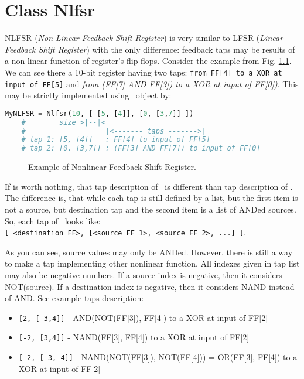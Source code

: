 \chapter{Class Nlfsr}

NLFSR (\textit{Non-Linear Feedback Shift Register}) is very similar to LFSR (\textit{Linear Feedback Shift Register}) with the only difference: feedback taps may be results of a non-linear function of register's flip-flops. Consider the example from Fig. \ref{nlfsr.example}. We can see there a 10-bit register having two taps: \texttt{from FF[4] to a XOR at input of FF[5]} and \textit{from (FF[7] AND FF[3]) to a XOR at input of FF[0])}. This may be strictly implemented using \Nlfsr\ object by:
\begin{lstlisting}[language=Python]
	MyNLFSR = Nlfsr(10, [ [5, [4]], [0, [3,7]] ])
	#        size >|--|<
	#                   |<------- taps ------->|
	# tap 1: [5, [4]]   : FF[4] to input of FF[5]
	# tap 2: [0. [3,7]] : (FF[3] AND FF[7]) to input of FF[0]
\end{lstlisting}

\begin{figure}[h]
	\centering
	\scalebox{.75}{}
	\caption{Example of Nonlinear Feedback Shift Register.}
	\label{nlfsr.example}
\end{figure}

\label{nlfsr:taps}
If is worth nothing, that tap description of \Nlfsr\ is different than tap description of \Lfsr. The difference is, that while each tap is still defined by a list, but the first item is not a source, but destination tap and the second item is a list of ANDed sources. So, each tap of \Nlfsr\ looks like: \\
\texttt{[ <destination\_FF>, [<source\_FF\_1>, <source\_FF\_2>, ...] ]}.

As you can see, source values may only be ANDed. However, there is still a way to make a tap implementing other nonlinear function. All indexes given in tap list may also be negative numbers. If a source index is negative, then it considers NOT(source). If a destination index is negative, then it considers NAND instead of AND. See example taps description:
\begin{itemize}
	\item \texttt{[2, [-3,4]]} - AND(NOT(FF[3]), FF[4]) to a XOR at input of FF[2]
	\item \texttt{[-2, [3,4]]} - NAND(FF[3], FF[4]) to a XOR at input of FF[2]
	\item \texttt{[-2, [-3,-4]]} - NAND(NOT(FF[3]), NOT(FF[4])) = OR(FF[3], FF[4]) to a XOR at input of FF[2]
\end{itemize}

